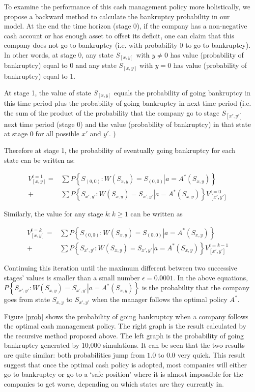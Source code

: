 \documentclass[12pt]{article}
\begin{document}
To examine the performance of this cash management policy more holistically, we propose a backward method to calculate the bankruptcy probability in our model. At the end the time horizon (stage 0), if the company has a non-negative cash account or has enough asset to offset its deficit, one can claim that this company does not go to bankruptcy (i.e. with probability 0 to go to bankruptcy). In other words, at stage 0, any state $S_{[x, y]}$ with $y \neq 0$ has value (probability of bankruptcy) equal to 0 and any state $S_{[x, y]}$ with $y = 0$ has value (probability of bankruptcy) equal to 1. 

At stage 1, the value of state $S_{[x, y]}$ equals the probability of going bankruptcy in this time period plus the probability of going bankruptcy in next time period (i.e. the sum of the product of the probability that the company go to stage $S_{[x', y']}$ next time period (stage 0) and the value (probability of bankruptcy) in that state at stage 0 for all possible $x'$ and $y'$. )

Therefore at stage 1, the probability of eventually going bankruptcy for each state can be written as: 

\[
\begin{split}
V_{[x,y]}^{t=1} =& \sum P\left\{\left.S_{(0,0)}:W(S_{x,y}) = S_{(0,0)}\right|a = A^*(S_{x,y})\right\} 
\\ 
+ & \sum P\left\{ \left. S_{x',y'}:W(S_{x,y}) = S_{x',y'} \right| a = A^* (S_{x,y})\right\}  V_{[x',y']}^{t=0}
\end{split}
\]

Similarly, the value for any stage $k: k \geq 1$ can be written as

\[
\begin{split}
V_{[x,y]}^{t=k} =& \sum P\left\{\left.S_{(0,0)}:W(S_{x,y}) = S_{(0,0)}\right|a = A^*(S_{x,y})\right\} 
\\ 
+ & \sum P\left\{ \left. S_{x',y'}:W(S_{x,y}) = S_{x',y'} \right| a = A^* (S_{x,y})\right\}  V_{[x',y']}^{t=k-1}
\end{split}
\]
 
 
  Continuing this iteration until the maximum different between two successive stages' values is smaller than a small number $\epsilon =  0.0001$. In the above equations, $P\left\{ \left. S_{x',y'}:W(S_{x,y}) = S_{x',y'} \right| a = A^* (S_{x,y})\right\}$ is the probability that the company goes from state  $S_{x,y}$ to $S_{x',y'}$ when the manager follows the optimal policy $A^*$.
  
Figure \ref{prob} shows the probability of going bankruptcy when a company follows the optimal cash management policy. The right graph is the result calculated by the recursive method proposed above. The left graph is the probability of going bankruptcy generated by 10,000 simulations. It can be seen that the two results are quite similar: both probabilities jump from $1.0$ to $0.0$ very quick. This result suggest that once the optimal cash policy is adopted, most companies will either go to bankruptcy or go to a `safe position' where it is almost impossible for the companies to get worse, depending on which states are they currently in.
\end{document}
